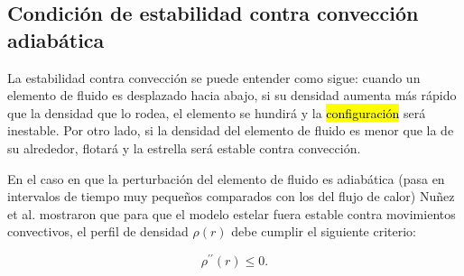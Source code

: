 \subsection{Condición de estabilidad contra convección adiabática}

La estabilidad contra convección se puede entender como sigue: cuando un elemento de fluido es desplazado hacia abajo, si su densidad aumenta más rápido que la densidad que lo rodea, el elemento se hundirá y la \hl{configuraci\'on} será inestable. Por otro lado, si la densidad del elemento de fluido es menor que la de su alrededor, flotará y la estrella será estable contra convección.

En el caso en que la perturbación del elemento de fluido es adiabática (pasa en intervalos de tiempo muy pequeños comparados con los del flujo de calor) Nuñez et al. \cite{Hernandez2018} mostraron que para que el modelo estelar fuera estable contra movimientos convectivos, el perfil de densidad $\rho(r)$ debe cumplir el siguiente criterio: 

\begin{equation}
    \rho ^ { \prime \prime } ( r ) \leq 0.
\end{equation}
